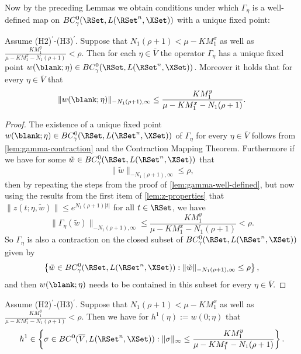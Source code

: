 \documentclass[a4paper]{siamart190516}
\begin{document}
 Now by the preceding Lemmas we obtain conditions under which $\Gamma_{\eta}$ is a well-defined map on $BC_{\gamma}^{0}(\RSet, L(\RSet^n,\XSet))$ with a unique fixed point:
 
\begin{corollary}\label{cor:Gamma-unique-fp}
 Assume (H2)$^\prime$-(H3)$^\prime$. Suppose that $N_1(\rho+1) < \mu - K M^x_1$ as well as $\frac{K M^y_1}{\mu-K M^x_1-N_1 (\rho+1)} < \rho$. Then for each $\eta \in \overline{V}$ the operator $\Gamma_{\eta}$ has a unique fixed point $w(\blank; \eta) \in BC^0_{\gamma}(\RSet, L(\RSet^n, \XSet))$. Moreover it holds that for every $\eta \in \overline{V}$ that
 \[
 \| w(\blank; \eta) \|_{-N_1(\rho+1),\infty} \leq \frac{K M^y_1}{\mu-K M^x_1-N_1(\rho+1)}.
 \]
\end{corollary}
 
 \begin{proof}
The existence of a unique fixed point $w(\blank; \eta) \in BC^0_{\gamma}(\RSet,
L(\RSet^n, \XSet))$ of $\Gamma_{\eta}$ for every $\eta \in \overline{V}$ follows from
\cref{lem:gamma-contraction} and the Contraction Mapping Theorem. Furthermore if we have for some $\tilde{w} \in BC^0_{\gamma}(\RSet, L(\RSet^n, \XSet))$ that
\[
 \| \tilde{w} \|_{-N_1(\rho+1),\infty} \leq \rho,
 \]
 then by repeating the steps from the proof of \cref{lem:gamma-well-defined}, but now
 using the results from the first item of \cref{lem:z-properties} that $\| z(t; \eta, \tilde{w}) \| \leq e^{N_1(\rho+1)|t|}$ for all $t \in \RSet$, we have 
 \[
 \|\Gamma_{\eta}(\tilde{w}) \|_{-N_1(\rho+1),\infty} \leq \frac{K M^y_1}{\mu-K M^x_1-N_1(\rho+1)} < \rho.
 \]
 So $\Gamma_{\eta}$ is also a contraction on the closed subset of $BC^0_{\gamma}(\RSet, L(\RSet^n, \XSet))$ given by
 \[
 \left\{ \tilde{w} \in BC^0_{\gamma}(\RSet, L(\RSet^n, \XSet)):   \| \tilde{w} \|_{-N_1(\rho+1),\infty} \leq \rho \right\},
 \]
 and then $w(\blank; \eta)$ needs to be contained in this subset for every $\eta \in \overline{V}$.
  \end{proof}
  
 \begin{lemma}\label{lem:h^1-bdd-ct}
Assume (H2)$^\prime$-(H3)$^\prime$. Suppose that $N_1(\rho+1) < \mu - K M^x_1$ as well as $\frac{K M^y_1}{\mu-K M^x_1-N_1 (\rho+1)} < \rho$. Then we have for $h^1(\eta) := w(0; \eta)$ that 
\[
h^1 \in  \left\{ \sigma \in BC^{0}(\overline{V}, L(\RSet^n,\XSet)): \| \sigma \|_{\infty} \leq \frac{ KM^y_1}{\mu-K M^x_1-N_1(\rho+1)} \right\}.
\]
 \end{lemma}
 
\end{document}
